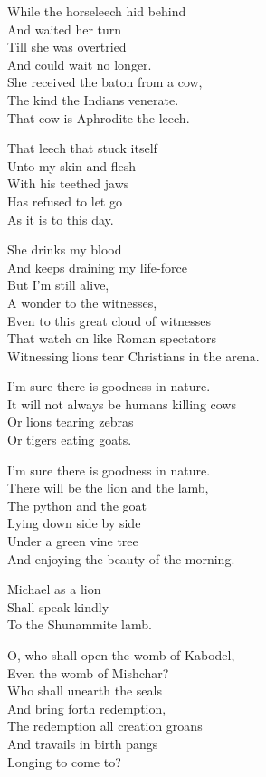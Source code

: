 \documentclass[
]{book}
\begin{document}
While the horseleech hid behind\\
And waited her turn\\
Till she was overtried\\
And could wait no longer.\\
She received the baton from a cow,\\
The kind the Indians venerate.\\
That cow is Aphrodite the leech.

That leech that stuck itself\\
Unto my skin and flesh\\
With his teethed jaws\\
Has refused to let go\\
As it is to this day.

She drinks my blood\\
And keeps draining my life-force\\
But I'm still alive,\\
A wonder to the witnesses,\\
Even to this great cloud of witnesses\\
That watch on like Roman spectators\\
Witnessing lions tear Christians in the arena.

I'm sure there is goodness in nature.\\
It will not always be humans killing cows\\
Or lions tearing zebras\\
Or tigers eating goats.

I'm sure there is goodness in nature.\\
There will be the lion and the lamb,\\
The python and the goat\\
Lying down side by side\\
Under a green vine tree\\
And enjoying the beauty of the morning.

Michael as a lion\\
Shall speak kindly\\
To the Shunammite lamb.

O, who shall open the womb of Kabodel,\\
Even the womb of Mishchar?\\
Who shall unearth the seals\\
And bring forth redemption,\\
The redemption all creation groans\\
And travails in birth pangs\\
Longing to come to?
\end{document}
